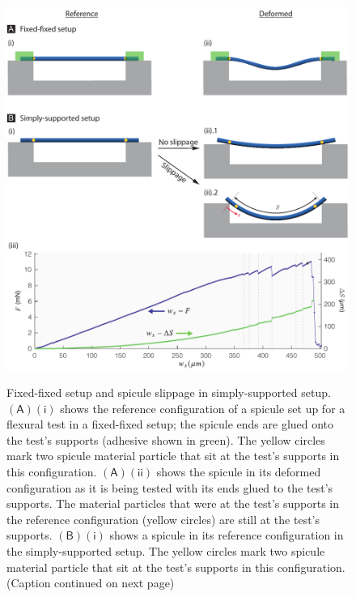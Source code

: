 \documentclass[preprint,10pt,times]{elsarticle}
\numberwithin{equation}{section}
\newcommand{\pr}[1]{\left( #1 \right)}
\newcommand{\subf}[1]{\pr{\textsf{#1}}}
\begin{document}
\begin{figure}
\centering{}
\includegraphics[width=1\textwidth]{../Figures_Submit/Slip_V8.pdf}
\label{fig:slip2}
\caption{Fixed-fixed setup and spicule slippage in simply-supported
setup.
$\subf{A}$$\subf{i}$ shows the reference configuration of
a spicule set up for a flexural test in a fixed-fixed setup; the spicule
ends are glued onto the test's supports (adhesive shown in green). The yellow circles mark two spicule material particle that sit at
the test's supports in this configuration. %
$\subf{A}$$\subf{ii}$ shows the spicule in its deformed configuration as it is being tested with its ends glued to the test's supports. The material particles that were at the test's supports in the reference configuration (yellow circles) are still at the test's supports. %
$\subf{B}$$\subf{i}$ shows a spicule in its reference configuration in the simply-supported setup. %
The yellow circles mark two spicule material particle that sit at
the test's supports in this configuration. %
(Caption continued on next page)}
\end{figure}
\end{document}
